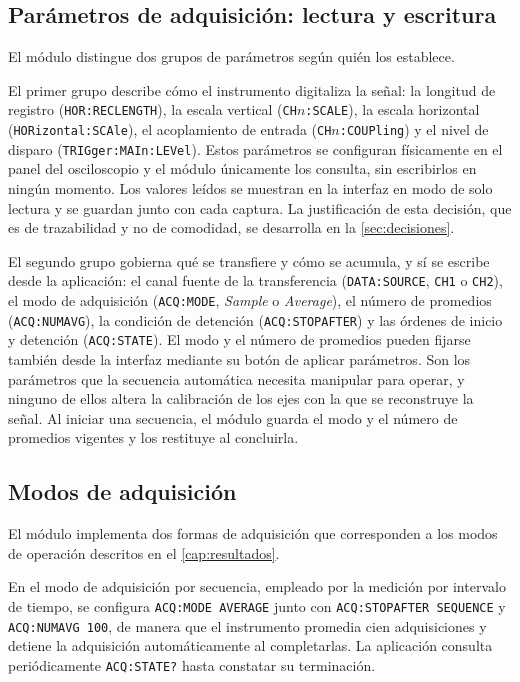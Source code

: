 \subsection*{Parámetros de adquisición: lectura y escritura}

El módulo distingue dos grupos de parámetros según quién los
establece.

El primer grupo describe cómo el instrumento digitaliza la señal: la
longitud de registro (\texttt{HOR:RECLENGTH}), la escala vertical
(\texttt{CH$n$:SCALE}), la escala horizontal
(\texttt{HORizontal:SCAle}), el acoplamiento de entrada
(\texttt{CH$n$:COUPling}) y el nivel de disparo
(\texttt{TRIGger:MAIn:LEVel}). Estos parámetros se configuran
físicamente en el panel del osciloscopio y el módulo únicamente los
consulta, sin escribirlos en ningún momento. Los valores leídos se
muestran en la interfaz en modo de solo lectura y se guardan junto con
cada captura. La justificación de esta decisión, que es de
trazabilidad y no de comodidad, se desarrolla en la
\cref{sec:decisiones}.

El segundo grupo gobierna qué se transfiere y cómo se acumula, y sí
se escribe desde la aplicación: el canal fuente de la transferencia
(\texttt{DATA:SOURCE}, \texttt{CH1} o \texttt{CH2}), el modo de
adquisición (\texttt{ACQ:MODE}, \textit{Sample} o \textit{Average}),
el número de promedios (\texttt{ACQ:NUMAVG}), la condición de
detención (\texttt{ACQ:STOPAFTER}) y las órdenes de inicio y detención
(\texttt{ACQ:STATE}). El modo y el número de promedios pueden fijarse
también desde la interfaz mediante su botón de aplicar parámetros. Son
los parámetros que la secuencia automática necesita manipular para
operar, y ninguno de ellos altera la calibración de los ejes con la
que se reconstruye la señal. Al iniciar una secuencia, el módulo
guarda el modo y el número de promedios vigentes y los restituye al
concluirla.

\subsection*{Modos de adquisición}

El módulo implementa dos formas de adquisición que corresponden a los
modos de operación descritos en el \cref{cap:resultados}.

En el modo de adquisición por secuencia, empleado por la medición
por intervalo de tiempo, se configura \texttt{ACQ:MODE AVERAGE} junto
con \texttt{ACQ:STOPAFTER SEQUENCE} y \texttt{ACQ:NUMAVG 100}, de
manera que el instrumento promedia cien adquisiciones y detiene la
adquisición automáticamente al completarlas. La aplicación consulta
periódicamente \texttt{ACQ:STATE?} hasta constatar su terminación.

